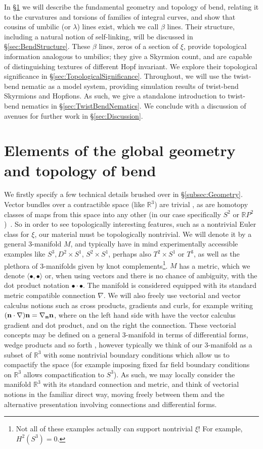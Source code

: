In \S\ref{sec:Elements} we will describe the fundamental geometry and topology of bend, relating it to the curvatures and torsions of families of integral curves, and show that cousins of umbilic (or $\lambda$) lines exist, which we call $\beta$ lines. Their structure, including a natural notion of self-linking, will be discussed in \S\ref{sec:BendStructure}. These $\beta$ lines, zeros of a section of $\xi$, provide topological information analogous to umbilics; they give a Skyrmion count, and are capable of distinguishing textures of different Hopf invariant. We explore their topological significance in \S\ref{sec:TopologicalSignificance}. Throughout, we will use the twist-bend nematic as a model system, providing simulation results of twist-bend Skyrmions and Hopfions. As such, we give a standalone introduction to twist-bend nematics in \S\ref{sec:TwistBendNematics}. We conclude with a discussion of avenues for further work in \S\ref{sec:Discussion}. 

\section{Elements of the global geometry and topology of bend} 
\label{sec:Elements} 
We firstly specify a few technical details brushed over in \S \ref{subsec:Geometry}. Vector bundles over a contractible space (like $\mathbb{R}^3$) are trivial \citep{MilnorStasheffBook}, as are homotopy classes of maps from this space into any other (in our case specifically $S^2$ or $\mathbb{R}P^2$)~\citep{Hatcher2012}. So in order to see topologically interesting features, such as a nontrivial Euler class for $\xi$, our material must be topologically nontrivial. We will denote it by a general 3-manifold $M$, and typically have in mind experimentally accessible examples like $S^3, D^2 \times S^1$, $S^2 \times S^1$, perhaps also $T^2 \times S^1$ or $T^3$, as well as the plethora of 3-manifolds given by knot complements\footnote{Not all of these examples actually can support nontrivial $\xi$! For example, $H^2(S^3)=0$.}. $M$ has a metric, which we denote $\langle \bullet , \bullet \rangle$ or, when using vectors and there is no chance of ambiguity, with the dot product notation $\bullet \cdot \bullet$. The manifold is considered equipped with its standard metric compatible connection $\nabla$. We will also freely use vectorial and vector calculus notions such as cross products, gradients and curls, for example writing $(\mathbf{n} \cdot \nabla \mathbf{)} \mathbf{n} = \nabla_{\mathbf{n}} \mathbf{n}$, where on the left hand side with have the vector calculus gradient and dot product, and on the right the connection. These vectorial concepts may be defined on a general 3-manifold in terms of differential forms, wedge products and so forth \citep{Lee1996, Frankel2015}, however typically we think of our 3-manifold as a subset of $\mathbb{R}^3$ with some nontrivial boundary conditions which allow us to compactify the space (for example imposing fixed far field boundary conditions on $\mathbb{R}^3$ allows compactification to $S^3$). As such, we may locally consider the manifold $\mathbb{R}^3$ with its standard connection and metric, and think of vectorial notions in the familiar direct way, moving freely between them and the alternative presentation involving connections and differential forms. 

